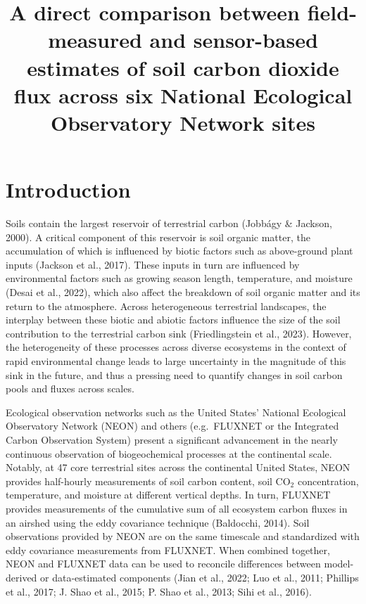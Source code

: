 \documentclass[
  letterpaper,
  DIV=11,
  numbers=noendperiod]{scrartcl}
\title{A direct comparison between field-measured and sensor-based
estimates of soil carbon dioxide flux across six National Ecological
Observatory Network sites}
\author{}
\date{}
\begin{document}
\maketitle


\section{Introduction}\label{introduction}

Soils contain the largest reservoir of terrestrial carbon (Jobbágy \&
Jackson, 2000). A critical component of this reservoir is soil organic
matter, the accumulation of which is influenced by biotic factors such
as above-ground plant inputs (Jackson et al., 2017). These inputs in
turn are influenced by environmental factors such as growing season
length, temperature, and moisture (Desai et al., 2022), which also
affect the breakdown of soil organic matter and its return to the
atmosphere. Across heterogeneous terrestrial landscapes, the interplay
between these biotic and abiotic factors influence the size of the soil
contribution to the terrestrial carbon sink (Friedlingstein et al.,
2023). However, the heterogeneity of these processes across diverse
ecosystems in the context of rapid environmental change leads to large
uncertainty in the magnitude of this sink in the future, and thus a
pressing need to quantify changes in soil carbon pools and fluxes across
scales.

Ecological observation networks such as the United States' National
Ecological Observatory Network (NEON) and others (e.g.~FLUXNET or the
Integrated Carbon Observation System) present a significant advancement
in the nearly continuous observation of biogeochemical processes at the
continental scale. Notably, at 47 core terrestrial sites across the
continental United States, NEON provides half-hourly measurements of
soil carbon content, soil CO\(_{2}\) concentration, temperature, and
moisture at different vertical depths. In turn, FLUXNET provides
measurements of the cumulative sum of all ecosystem carbon fluxes in an
airshed using the eddy covariance technique (Baldocchi, 2014). Soil
observations provided by NEON are on the same timescale and standardized
with eddy covariance measurements from FLUXNET. When combined together,
NEON and FLUXNET data can be used to reconcile differences between
model-derived or data-estimated components (Jian et al., 2022; Luo et
al., 2011; Phillips et al., 2017; J. Shao et al., 2015; P. Shao et al.,
2013; Sihi et al., 2016).
\end{document}
